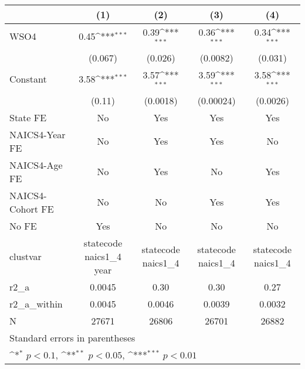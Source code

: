 {
\def\sym#1{\ifmmode^{#1}\else\(^{#1}\)\fi}
\begin{tabular}{l*{4}{c}}
\hline\hline
                    &\multicolumn{1}{c}{(1)}         &\multicolumn{1}{c}{(2)}         &\multicolumn{1}{c}{(3)}         &\multicolumn{1}{c}{(4)}         \\
\hline
WSO4                &        0.45\sym{***}&        0.39\sym{***}&        0.36\sym{***}&        0.34\sym{***}\\
                    &     (0.067)         &     (0.026)         &    (0.0082)         &     (0.031)         \\
[1em]
Constant            &        3.58\sym{***}&        3.57\sym{***}&        3.59\sym{***}&        3.58\sym{***}\\
                    &      (0.11)         &    (0.0018)         &   (0.00024)         &    (0.0026)         \\
[1em]
State FE            &          No         &         Yes         &         Yes         &         Yes         \\
[1em]
NAICS4-Year FE      &          No         &         Yes         &         Yes         &          No         \\
[1em]
NAICS4-Age FE       &          No         &         Yes         &          No         &         Yes         \\
[1em]
NAICS4-Cohort FE    &          No         &          No         &         Yes         &         Yes         \\
[1em]
No FE               &         Yes         &          No         &          No         &          No         \\
\hline
clustvar            &statecode naics1\_4 year         &statecode naics1\_4         &statecode naics1\_4         &statecode naics1\_4         \\
r2\_a                &      0.0045         &        0.30         &        0.30         &        0.27         \\
r2\_a\_within         &      0.0045         &      0.0046         &      0.0039         &      0.0032         \\
N                   &       27671         &       26806         &       26701         &       26882         \\
\hline\hline
\multicolumn{5}{l}{\footnotesize Standard errors in parentheses}\\
\multicolumn{5}{l}{\footnotesize \sym{*} \(p<0.1\), \sym{**} \(p<0.05\), \sym{***} \(p<0.01\)}\\
\end{tabular}
}
